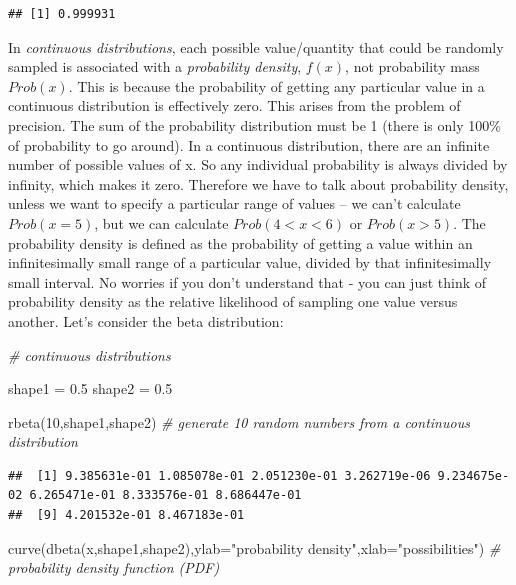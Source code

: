\documentclass[
]{article}
\newenvironment{Shaded}{\begin{snugshade}}{\end{snugshade}}
\newcommand{\AttributeTok}[1]{\textcolor[rgb]{0.77,0.63,0.00}{#1}}
\newcommand{\CommentTok}[1]{\textcolor[rgb]{0.56,0.35,0.01}{\textit{#1}}}
\newcommand{\DecValTok}[1]{\textcolor[rgb]{0.00,0.00,0.81}{#1}}
\newcommand{\FloatTok}[1]{\textcolor[rgb]{0.00,0.00,0.81}{#1}}
\newcommand{\FunctionTok}[1]{\textcolor[rgb]{0.00,0.00,0.00}{#1}}
\newcommand{\NormalTok}[1]{#1}
\newcommand{\OtherTok}[1]{\textcolor[rgb]{0.56,0.35,0.01}{#1}}
\newcommand{\StringTok}[1]{\textcolor[rgb]{0.31,0.60,0.02}{#1}}
\begin{document}
\begin{verbatim}
## [1] 0.999931
\end{verbatim}

In \emph{continuous distributions}, each possible value/quantity that
could be randomly sampled is associated with a \emph{probability
density}, \(f(x)\), not probability mass \(Prob(x)\). This is because
the probability of getting any particular value in a continuous
distribution is effectively zero. This arises from the problem of
precision. The sum of the probability distribution must be 1 (there is
only 100\% of probability to go around). In a continuous distribution,
there are an infinite number of possible values of x. So any individual
probability is always divided by infinity, which makes it zero.
Therefore we have to talk about probability density, unless we want to
specify a particular range of values -- we can't calculate
\(Prob(x = 5)\), but we can calculate \(Prob(4 < x < 6)\) or
\(Prob(x > 5)\). The probability density is defined as the probability
of getting a value within an infinitesimally small range of a particular
value, divided by that infinitesimally small interval. No worries if you
don't understand that - you can just think of probability density as the
relative likelihood of sampling one value versus another. Let's consider
the beta distribution:

\begin{Shaded}
\begin{Highlighting}[]
\CommentTok{\# continuous distributions}

\NormalTok{shape1 }\OtherTok{=} \FloatTok{0.5}
\NormalTok{shape2 }\OtherTok{=} \FloatTok{0.5}

\FunctionTok{rbeta}\NormalTok{(}\DecValTok{10}\NormalTok{,shape1,shape2)   }\CommentTok{\# generate 10 random numbers from a continuous distribution}
\end{Highlighting}
\end{Shaded}

\begin{verbatim}
##  [1] 9.385631e-01 1.085078e-01 2.051230e-01 3.262719e-06 9.234675e-02 6.265471e-01 8.333576e-01 8.686447e-01
##  [9] 4.201532e-01 8.467183e-01
\end{verbatim}

\begin{Shaded}
\begin{Highlighting}[]
\FunctionTok{curve}\NormalTok{(}\FunctionTok{dbeta}\NormalTok{(x,shape1,shape2),}\AttributeTok{ylab=}\StringTok{"probability density"}\NormalTok{,}\AttributeTok{xlab=}\StringTok{"possibilities"}\NormalTok{)   }\CommentTok{\# probability density function (PDF)}
\end{Highlighting}
\end{Shaded}
\end{document}
